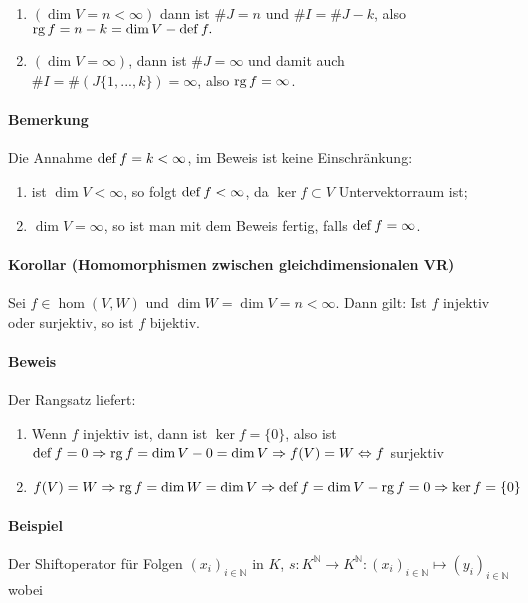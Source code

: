 	\begin{enumerate}[1.{ Fall}]
		\item $(\dim V = n<\infty)$ dann ist $\# J = n$ und $\# I = \# J-k$, also $\operatorname{rg} f = n-k = \dim V - \operatorname{def} f.$\\
		\item $(\dim V = \infty)$, dann ist $\# J = \infty $ und damit auch $\#I =\#(J\{{1,...,k\}})=\infty $, also $\operatorname{rg} f= \infty$.
	\end{enumerate}
	
\paragraph{Bemerkung}
	Die Annahme $\operatorname{def} f = k<\infty$, im Beweis ist keine Einschränkung:
	\begin{enumerate}
		\item ist $\dim V < \infty$, so folgt $\operatorname{def} f<\infty$, da $\ker f\subset V$ Untervektorraum ist;			
		\item $\dim V = \infty$, so ist man mit dem Beweis fertig, falls $\operatorname{def} f = \infty$.
	\end{enumerate}
			
\paragraph{Korollar (Homomorphismen zwischen gleichdimensionalen VR)} 
	\begin{Korollar}
		Sei $f\in \hom(V,W)$ und $\dim W = \dim V = n<\infty$.
	Dann gilt: Ist $f$ injektiv oder surjektiv, so ist $f$ bijektiv.
	\end{Korollar}
	
\paragraph{Beweis} 
	Der Rangsatz liefert:
	\begin{enumerate}
		\item Wenn $ f $ injektiv ist, dann ist $\ker f = \{{0\}}$, also ist $ \operatorname{def} f = 0 \Rightarrow \operatorname{rg} f = \dim V-0 = \dim V \Rightarrow f(V) = W \Leftrightarrow f$ surjektiv
		\item $f(V) = W \Rightarrow \operatorname{rg} f = \dim W = \dim V \Rightarrow \operatorname{def} f= \dim V - \operatorname{rg} f=0 \Rightarrow \ker f = \{{0}\}$
	\end{enumerate}
	
\paragraph{Beispiel}
	Der Shiftoperator für Folgen $(x_i)_{i\in \mathbb{N}}$ in $K$, $s: K^{\mathbb{N}} \to K^{\mathbb{N}}: (x_i)_{i\in \mathbb{N}} \mapsto (y_i)_{i\in \mathbb{N}}$ wobei
	
